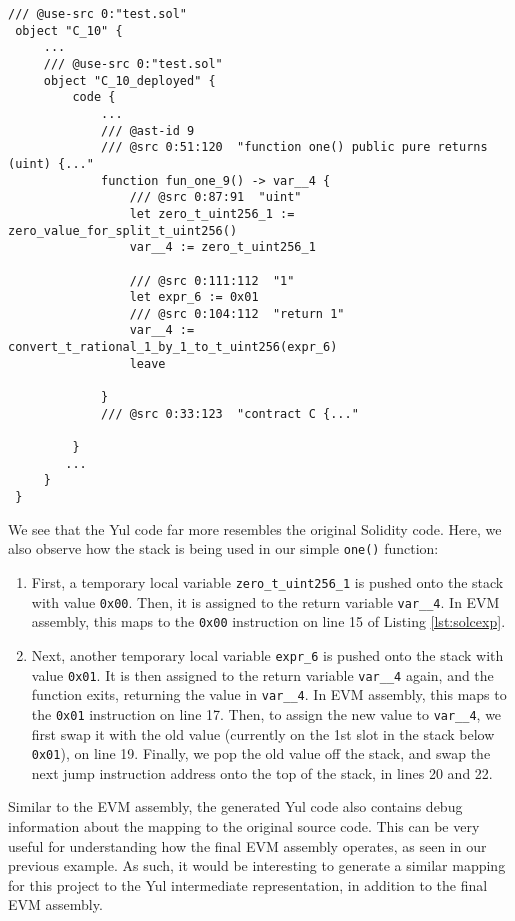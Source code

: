 \begin{lstlisting}[language=plantuml, caption={Yul IR from the Solidity compiler}, label={lst:solcexp}, basicstyle=\ttfamily\scriptsize]
 /// @use-src 0:"test.sol"
 object "C_10" {
     ...
     /// @use-src 0:"test.sol"
     object "C_10_deployed" {
         code {
             ...
             /// @ast-id 9
             /// @src 0:51:120  "function one() public pure returns (uint) {..."
             function fun_one_9() -> var__4 {
                 /// @src 0:87:91  "uint"
                 let zero_t_uint256_1 := zero_value_for_split_t_uint256()
                 var__4 := zero_t_uint256_1
 
                 /// @src 0:111:112  "1"
                 let expr_6 := 0x01
                 /// @src 0:104:112  "return 1"
                 var__4 := convert_t_rational_1_by_1_to_t_uint256(expr_6)
                 leave
 
             }
             /// @src 0:33:123  "contract C {..."
 
         }
        ...
     }
 }
\end{lstlisting}

We see that the Yul code far more resembles the original Solidity code. Here, we also
observe how the stack is being used in our simple \texttt{one()} function:

\begin{enumerate}
  \item First, a temporary local variable \texttt{zero\_t\_uint256\_1} is pushed onto the stack with value \texttt{0x00}. 
  Then, it is assigned to the return variable \texttt{var\_\_4}. In EVM assembly, this maps to
  the \texttt{0x00} instruction on line 15 of Listing \ref{lst:solcexp}.
  \item Next, another temporary local variable \texttt{expr\_6} is pushed onto the stack with
  value \texttt{0x01}. It is then assigned to the return variable \texttt{var\_\_4} again, and the function
  exits, returning the value in \texttt{var\_\_4}. In EVM assembly, this maps to the \texttt{0x01}
  instruction on line 17. Then, to assign the new value to \texttt{var\_\_4}, we first swap it with the
  old value (currently on the 1st slot in the stack below \texttt{0x01}), on line 19. Finally, we pop the
  old value off the stack, and swap the next jump instruction address onto the top of the stack, in
  lines 20 and 22.
\end{enumerate}

Similar to the EVM assembly, the generated Yul code also contains debug information about
the mapping to the original source code. This can be very useful for understanding how the
final EVM assembly operates, as seen in our previous example. As such, it would be
interesting to generate a similar mapping for this project to the Yul intermediate
representation, in addition to the final EVM assembly.
